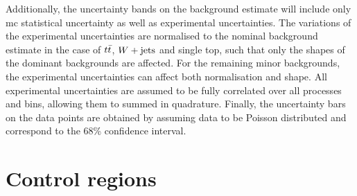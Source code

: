 Additionally, the uncertainty bands on the background estimate will include only \gls{mc} statistical uncertainty as well as experimental uncertainties. The variations of the experimental uncertainties are normalised to the nominal background estimate in the case of $t\bar{t}$, $W+\mathrm{jets}$ and single top, such that only the shapes of the dominant backgrounds are affected. For the remaining minor backgrounds, the experimental uncertainties can affect both normalisation and shape. All experimental uncertainties are assumed to be fully correlated over all processes and bins, allowing them to summed in quadrature. Finally, the uncertainty bars on the data points are obtained by assuming data to be Poisson distributed and correspond to the 68\% confidence interval. 

\section{Control regions}\label{sec:control_regions}

\begin{table}
\begin{center}
\caption{Overview of the CR and VR definitions. With the exception of $\mlb$, which is not used in the definitions of the \glspl{cr} and \glspl{vr}, all regions share the same selection as the \glspl{sr} on the remaining kinematic observables not listed here.} 
\label{tab:CRVRdef}
\end{center}
\end{table}

